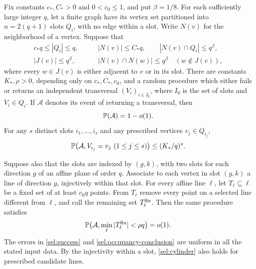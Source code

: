 \begin{proposition}
\label{sel:selection}
Fix constants $c_*,C_*>0$ and $0<c_0\le1$, and put $\beta=1/8$.
For each sufficiently large integer $q$, let a finite graph have its
vertex set partitioned into $n=2(q+1)$ slots $Q_i$, with no edge within
a slot.  Write $N(v)$ for the neighborhood of a vertex.  Suppose that
\begin{align}
 c_*q\le |Q_i|\le q,&\qquad |N(v)|\le C_*q,
 \qquad |N(v)\cap Q_i|\le q^\beta,\label{sel:graph-bounds}\\
 |J(v)|\le q^\beta,&\qquad
 |N(v)\cap N(w)|\le q^\beta\quad(w\notin J(v)),\label{sel:exceptional}
\end{align}
where every $w\in J(v)$ is either adjacent to $v$ or in its slot.
There are constants $K_*,\rho>0$, depending only on $c_*,C_*,c_0$,
and a random procedure which either fails or returns an independent
transversal $(V_i)_{i\in I_0}$, where $I_0$ is the set of slots and
$V_i\in Q_i$.  If $\mathcal A$ denotes its event of returning a
transversal, then
\begin{equation}\label{sel:success}
 \mathbb P(\mathcal A)=1-o(1).
\end{equation}
For any $s$ distinct slots $i_1,\ldots,i_s$ and any prescribed vertices
$v_j\in Q_{i_j}$,
\begin{equation}\label{sel:cylinder}
 \mathbb P\bigl(\mathcal A, V_{i_j}=v_j\ (1\le j\le s)\bigr)
 \le (K_*/q)^s.
\end{equation}

Suppose also that the slots are indexed by $(g,k)$, with two slots for
each direction $g$ of an affine plane of order $q$.  Associate to each
vertex in slot $(g,k)$ a line of direction $g$, injectively within
that slot.  For every affine line $\ell$, let $T_\ell\subseteq\ell$
be a fixed set of at least $c_0q$ points.  From $T_\ell$ remove every
point on a selected line different from $\ell$, and call the remaining
set $T_\ell^{\rm fin}$.  Then the same procedure satisfies
\begin{equation}\label{sel:occupancy-conclusion}
 \mathbb P\bigl(\mathcal A, \min_\ell |T_\ell^{\rm fin}|<\rho q\bigr)
 =o(1).
\end{equation}
The errors in \eqref{sel:success} and
\eqref{sel:occupancy-conclusion} are uniform in all the stated input
data.  By the injectivity within a slot, \eqref{sel:cylinder} also
holds for prescribed candidate lines.
\end{proposition}

